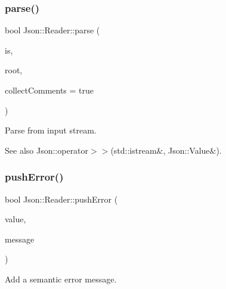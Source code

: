 \mbox{\label{class_json_1_1_reader_a6d5d0e23f68749d2f17feece4ccf504d}} 
\subsubsection{\texorpdfstring{parse()}{parse()}\hspace{0.1cm}{\footnotesize\ttfamily [3/3]}}
{\footnotesize\ttfamily bool Json\+::\+Reader\+::parse (\begin{DoxyParamCaption}\item[{\hyperlink{json_8h_a15f2f70b2ce0a2abd0f8112393dbc4de}{J\+S\+O\+N\+C\+P\+P\+\_\+\+I\+S\+T\+R\+E\+AM} \&}]{is,  }\item[{\hyperlink{class_json_1_1_value}{Value} \&}]{root,  }\item[{bool}]{collect\+Comments = {\ttfamily true} }\end{DoxyParamCaption})}



Parse from input stream. 

\begin{DoxySeeAlso}{See also}
Json\+::operator$>$$>$(std\+::istream\&, Json\+::\+Value\&). 
\end{DoxySeeAlso}
\mbox{\label{class_json_1_1_reader_af5fa7099083f01706635ade1d0f8ddb5}} 
\subsubsection{\texorpdfstring{push\+Error()}{pushError()}\hspace{0.1cm}{\footnotesize\ttfamily [1/2]}}
{\footnotesize\ttfamily bool Json\+::\+Reader\+::push\+Error (\begin{DoxyParamCaption}\item[{const \hyperlink{class_json_1_1_value}{Value} \&}]{value,  }\item[{const \hyperlink{json_8h_a1e723f95759de062585bc4a8fd3fa4be}{J\+S\+O\+N\+C\+P\+P\+\_\+\+S\+T\+R\+I\+NG} \&}]{message }\end{DoxyParamCaption})}



Add a semantic error message. 


